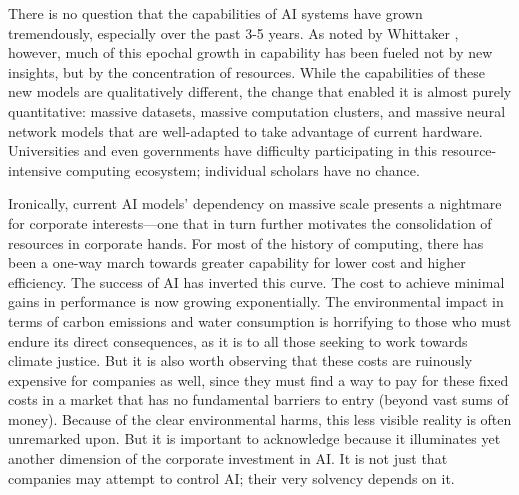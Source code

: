 There is no question that the capabilities of AI systems have grown tremendously, especially over the past 3-5 years. As noted by Whittaker \cite{Whittaker_2021}, however, much of this epochal growth in capability has been fueled not by new insights, but by the concentration of resources. While the capabilities of these new models are qualitatively different, the change that enabled it is almost purely quantitative: massive datasets, massive computation clusters, and massive neural network models that are well-adapted to take advantage of current hardware. Universities and even governments have difficulty participating in this resource-intensive computing ecosystem; individual scholars have no chance. 

Ironically, current AI models’ dependency on massive scale presents a nightmare for corporate interests---one that in turn further motivates the consolidation of resources in corporate hands. For most of the history of computing, there has been a one-way march towards greater capability for lower cost and higher efficiency. The success of AI has inverted this curve. The cost to achieve minimal gains in performance is now growing exponentially. The environmental impact in terms of carbon emissions and water consumption is horrifying to those who must endure its direct consequences, as it is to all those seeking to work towards climate justice. But it is also worth observing that these costs are ruinously expensive for companies as well, since they must find a way to pay for these fixed costs in a market that has no fundamental barriers to entry (beyond vast sums of money). Because of the clear environmental harms, this less visible reality is often unremarked upon. But it is important to acknowledge because it illuminates yet another dimension of the corporate investment in AI. It is not just that companies may attempt to control AI; their very solvency depends on it. 

